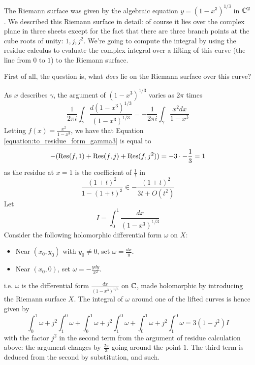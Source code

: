 \documentclass{article}
\begin{document}
The Riemann surface was given by the algebraic equation \(y = (1 - x^3)^{1/3}\) in \(\mathbb{C}^2\). We described this Riemann surface in detail: of course it lies over the complex plane in three sheets except for the fact that there are three branch points at the cube roots of unity: \(1, j, j^2\). We're going to compute the integral by using the residue calculus to evaluate the complex integral over a lifting of this curve (the line from \(0\) to \(1\)) to the Riemann surface.

First of all, the question is, what \textit{does} lie on the Riemann surface over this curve?

As \(x\) describes \(\gamma\), the argument of \((1 - x^3)^{1/3}\) varies as \(2\pi\) times
\begin{equation}
  \frac{1}{2\pi i}\int_\gamma\frac{d(1 - x^3)^{1/3}}{(1 - x^3)^{1/3}}
  = -\frac{1}{2\pi i}\int_\gamma\frac{x^2dx}{1 - x^3}
  \label{equation:to_residue_form_gamma3}
\end{equation}
Letting \(f(x) = \frac{x^2}{1 - x^3}\), we have that Equation \ref{equation:to_residue_form_gamma3} is equal to
\begin{equation}
  -(\operatorname{Res}(f, 1) + \operatorname{Res}(f, j) + \operatorname{Res}(f, j^2)) = -3 \cdot -\frac{1}{3} = 1
\end{equation}
as the residue at \(x = 1\) is the coefficient of \(\frac{1}{t}\) in
\begin{equation}
  \frac{(1 + t)^2}{1 - (1 + t)^3} \in -\frac{(1 + t)^2}{3t + O(t^2)}
\end{equation}
Let
\begin{equation}
  I = \int_0^1\frac{dx}{(1 - x^3)^{1/3}}
\end{equation}
Consider the following holomorphic differential form \(\omega\) on \(X\):
\begin{itemize}

  \item Near \((x_0, y_0)\) with \(y_0 \neq 0\), set \(\omega = \frac{dx}{y}\).

  \item Near \((x_0, 0)\), set \(\omega = -\frac{ydy}{x^2}\).

\end{itemize}
i.e. \(\omega\) is the differential form \(\frac{dx}{(1 - x^3)^{1/3}}\) on \(\mathbb{C}\), made holomorphic by introducing the Riemann surface \(X\).
The integral of \(\omega\) around one of the lifted curves is hence given by
\begin{equation}
  \int_0^1\omega + j^2\int_1^0\omega + \int_0^1\omega + j^2\int_1^0\omega + \int_0^1\omega + j^2\int_1^0\omega = 3(1 - j^2)I
\end{equation}
with the factor \(j^2\) in the second term from the argument of residue calculation above: the argument changes by \(\frac{2\pi}{3}\) going around the point \(1\). The third term is deduced from the second by substitution, and such.
\end{document}
